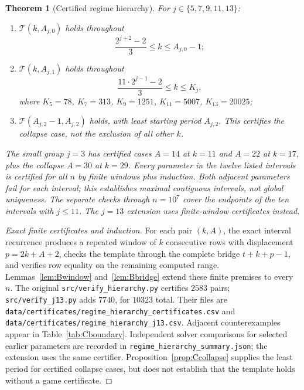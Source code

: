 \documentclass[11pt]{article}
\newtheorem{theorem}{Theorem}[section]
\theoremstyle{remark}
\begin{document}
\begin{theorem}[Certified regime hierarchy]\label{thm:Chierarchy}
For $j\in\{5,7,9,11,13\}$:
\begin{enumerate}\itemsep0.2em
\item $\mathcal{T}(k,A_{j,0})$ holds throughout
\[
\frac{2^{j+2}-2}{3}\le k\le A_{j,0}-1;
\]
\item $\mathcal{T}(k,A_{j,1})$ holds throughout
\[
\frac{11\cdot2^{j-1}-2}{3}\le k\le K_j,
\]
where $K_5=78$, $K_7=313$, $K_9=1251$, $K_{11}=5007$, $K_{13}=20025$;
\item $\mathcal{T}(A_{j,2}-1,A_{j,2})$ holds, with least starting period $A_{j,2}$. This certifies the collapse case, not the exclusion of all other $k$.
\end{enumerate}
The small group $j=3$ has certified cases $A=14$ at $k=11$ and $A=22$ at $k=17$, plus the collapse $A=30$ at $k=29$. Every parameter in the twelve listed intervals is certified for all $n$ by finite windows plus induction. Both adjacent parameters fail for each interval; this establishes maximal contiguous intervals, not global uniqueness. The separate checks through $n=10^7$ cover the endpoints of the ten intervals with $j\le11$. The $j=13$ extension uses finite-window certificates instead.
\end{theorem}
\begin{proof}[Exact finite certificates and induction]
For each pair $(k,A)$, the exact interval recurrence produces a repeated window of $k$ consecutive rows with displacement $p=2k+A+2$, checks the template through the complete bridge $t+k+p-1$, and verifies row equality on the remaining computed range. Lemmas~\ref{lem:Bwindow} and~\ref{lem:Bbridge} extend these finite premises to every $n$. The original \texttt{src/verify\_hierarchy.py} certifies $2583$ pairs; \texttt{src/verify\_j13.py} adds $7740$, for $10323$ total. Their files are \texttt{data/certificates/regime\_hierarchy\_certificates.csv} and \texttt{data/certificates/regime\_hierarchy\_j13.csv}. Adjacent counterexamples appear in Table~\ref{tab:Cboundary}. Independent solver comparisons for selected earlier parameters are recorded in \texttt{regime\_hierarchy\_summary.json}; the extension uses the same certifier. Proposition~\ref{prop:Ccollapse} supplies the least period for certified collapse cases, but does not establish that the template holds without a game certificate.
\end{proof}
\end{document}

